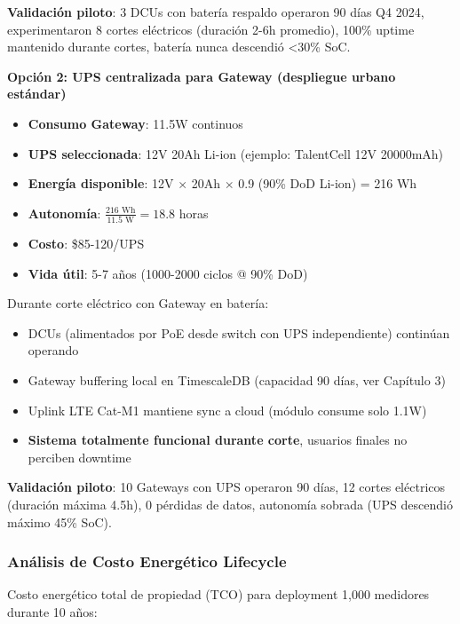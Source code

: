 \textbf{Validación piloto}: 3 DCUs con batería respaldo operaron 90 días Q4 2024, experimentaron 8 cortes eléctricos (duración 2-6h promedio), 100\% uptime mantenido durante cortes, batería nunca descendió <30\% SoC.

\textbf{Opción 2: UPS centralizada para Gateway (despliegue urbano estándar)}

\begin{itemize}
    \item \textbf{Consumo Gateway}: 11.5W continuos
    \item \textbf{UPS seleccionada}: 12V 20Ah Li-ion (ejemplo: TalentCell 12V 20000mAh)
    \item \textbf{Energía disponible}: 12V $\times$ 20Ah $\times$ 0.9 (90\% DoD Li-ion) = 216 Wh
    \item \textbf{Autonomía}: $\frac{216 \text{ Wh}}{11.5 \text{ W}} = 18.8$ horas
    \item \textbf{Costo}: \$85-120/UPS
    \item \textbf{Vida útil}: 5-7 años (1000-2000 ciclos @ 90\% DoD)
\end{itemize}

Durante corte eléctrico con Gateway en batería:
\begin{itemize}
    \item DCUs (alimentados por PoE desde switch con UPS independiente) continúan operando
    \item Gateway buffering local en TimescaleDB (capacidad 90 días, ver Capítulo 3)
    \item Uplink LTE Cat-M1 mantiene sync a cloud (módulo consume solo 1.1W)
    \item \textbf{Sistema totalmente funcional durante corte}, usuarios finales no perciben downtime
\end{itemize}

\textbf{Validación piloto}: 10 Gateways con UPS operaron 90 días, 12 cortes eléctricos (duración máxima 4.5h), 0 pérdidas de datos, autonomía sobrada (UPS descendió máximo 45\% SoC).

\subsubsection{Análisis de Costo Energético Lifecycle}

Costo energético total de propiedad (TCO) para deployment 1,000 medidores durante 10 años:

